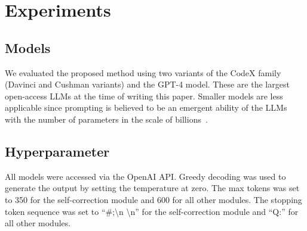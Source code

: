 \section{Experiments}
\subsection{Models}
We evaluated the proposed method using two variants of the CodeX family (Davinci and Cushman variants) %
and the GPT-4 model. These are the largest open-access LLMs at the time of writing this paper. Smaller models are less applicable since prompting is believed to be an emergent ability of the LLMs with the number of parameters in the scale of billions~\citep{wei2022emergent}.

\subsection{Hyperparameter}
All models were accessed via the OpenAI API. Greedy
decoding was used to generate the output by setting the temperature at zero. The max tokens was set to 350 for the self-correction module and 600 for all other modules. The stopping token sequence was set to ``\#;\textbackslash n \textbackslash n'' for the self-correction module and ``Q:'' for all other modules.

